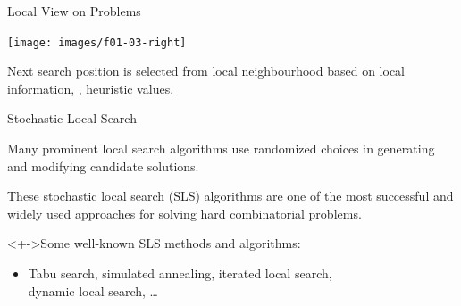 \begin{frame}[c]{Local View on Problems}

\begin{center}
\texttt{[image: images/f01-03-right]}
\end{center}

\bigskip
Next search position is selected from local neighbourhood
  based on local information, \eg{}, heuristic values.

\end{frame}
\begin{frame}[c]{Stochastic Local Search}

\onslide<+->
{Many prominent local search algorithms use
\alert{randomized choices} in generating
and modifying candidate solutions.
}

\medskip

\onslide<+->
These \alert{stochastic local search (SLS) algorithms}
are one of the most successful and widely used approaches
for solving hard combinatorial problems.

\medskip

\begin{block}<+->{Some well-known SLS methods and algorithms:}
\begin{itemize}
\item Tabu search, simulated annealing, iterated local search,\\ dynamic local search, \ldots
\end{itemize}
\end{block}

\end{frame}
% 
